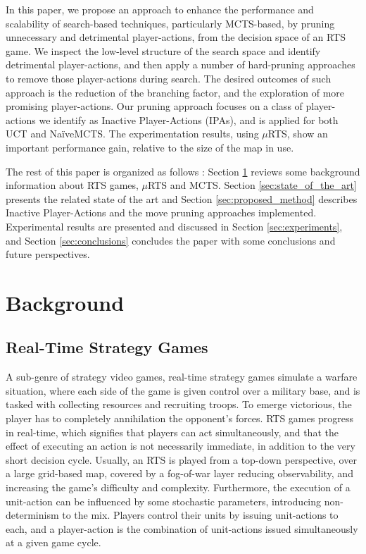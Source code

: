 \documentclass[conference]{IEEEtran}
\newcommand{\mRTS}{$\mu$RTS}
\begin{document}
In this paper, we propose an approach to enhance the performance and scalability of search-based techniques, particularly MCTS-based, by pruning unnecessary and detrimental player-actions, from the decision space of an RTS game. We inspect the low-level structure of the search space and identify detrimental player-actions, and then apply a number of hard-pruning approaches to remove those player-actions during search. The desired outcomes of such approach is the reduction of the branching factor, and the exploration of more promising player-actions. Our pruning approach focuses on a class of player-actions we identify as Inactive Player-Actions (IPAs), and is applied for both UCT and NaïveMCTS. The experimentation results, using \mRTS{}, show an important performance gain, relative to the size of the map in use.

The rest of this paper is organized as follows : Section \ref{sec:background} reviews some background information about RTS games, \mRTS{} and MCTS. Section \ref{sec:state_of_the_art} presents the related state of the art and Section \ref{sec:proposed_method} describes Inactive Player-Actions and the move pruning approaches implemented. Experimental results are presented and discussed in Section \ref{sec:experiments}, and Section \ref{sec:conclusions} concludes the paper with some conclusions and future perspectives.


\section{Background}
\label{sec:background}

\subsection{Real-Time Strategy Games}

A sub-genre of strategy video games, real-time strategy games simulate a warfare situation, where each side of the game is given control over a military base, and is tasked with collecting resources and recruiting troops. To emerge victorious, the player has to completely annihilation the opponent's forces. RTS games progress in real-time, which signifies that players can act simultaneously, and that the effect of executing an action is not necessarily immediate, in addition to the very short decision cycle. Usually, an RTS is played from a top-down perspective, over a large grid-based map, covered by a fog-of-war layer reducing observability, and increasing the game's difficulty and complexity. Furthermore, the execution of a unit-action can be influenced by some stochastic parameters, introducing non-determinism to the mix. Players control their units by issuing unit-actions to each, and a player-action is the combination of unit-actions issued simultaneously at a given game cycle.
\end{document}
